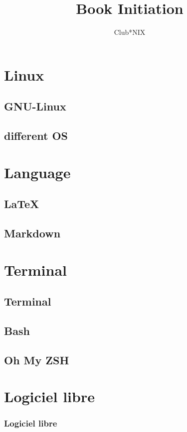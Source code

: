 \documentclass[a4paper]{report}
\title{Book Initiation}
\author{Club*NIX}
\begin{document}
\maketitle

\tableofcontents
\newpage


\chapter{Linux}
 \section{GNU-Linux}
    
 \section{different OS}
    
    
\chapter{Language}
  \section{LaTeX}
    
  \section{Markdown}
    
    
\chapter{Terminal}
  \section{Terminal}
    
  \section{Bash}
    
  \section{Oh My ZSH}
    
    
\chapter{Logiciel libre}

\subsection{Logiciel libre}
\end{document}
